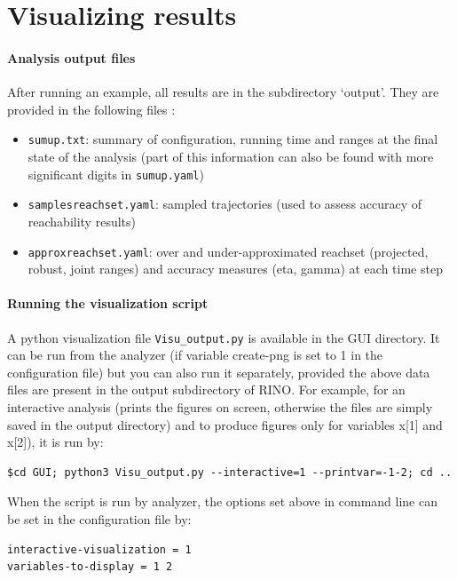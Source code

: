 \documentclass{article}
\begin{document}


\section{Visualizing results}

\paragraph{Analysis output files}
After running an example, all results are in the subdirectory ‘output’. They are provided in the following files : 
\begin{itemize}[noitemsep]
\item \texttt{sumup.txt}: summary of configuration, running time and ranges at the final state of the analysis (part of this information can also be found with more significant digits in \texttt{sumup.yaml})
\item \texttt{samplesreachset.yaml}: sampled trajectories (used to assess accuracy of reachability results)
\item \texttt{approxreachset.yaml}: over and under-approximated reachset (projected, robust, joint ranges) and accuracy measures (eta, gamma) at each time step 
\end{itemize}

\paragraph{Running the visualization script}
A python visualization file \texttt{Visu\_output.py} is available in the GUI directory. It can be run from the analyzer (if variable create-png is set to 1 in the configuration file) but you can also run it separately,  provided the above data files are present in the output subdirectory of RINO. 
For example, for an interactive analysis (prints the figures on screen, otherwise the files are simply saved in the output directory) and to produce figures only for variables x[1] and x[2]),  it is run by:
\begin{verbatim}
$cd GUI; python3 Visu_output.py --interactive=1 --printvar=-1-2; cd ..
\end{verbatim}
When the script is run by analyzer, the options set above in command line can be set in the configuration file by: 
\begin{verbatim}
interactive-visualization = 1
variables-to-display = 1 2
\end{verbatim}
\end{document}
